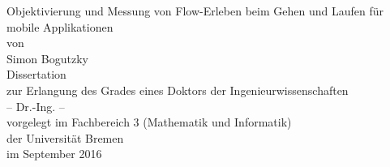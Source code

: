 \begin{titlepage}
\begin{singlespace}
\begin{center}
\Huge Objektivierung und Messung von Flow-Erleben beim Gehen und Laufen für mobile Applikationen\\
\vspace{15mm}
\normalsize von\\
\normalsize Simon Bogutzky\\
\vspace{30mm}
\normalsize Dissertation\\
\normalsize zur Erlangung des Grades eines Doktors der Ingenieurwissenschaften\\
\normalsize  -- Dr.-Ing. --\\
\vspace{80mm}
\normalsize vorgelegt im Fachbereich 3 (Mathematik und Informatik)\\
\normalsize der Universität Bremen\\
\normalsize im September 2016\\
\end{center}
\end{singlespace}
\end{titlepage}